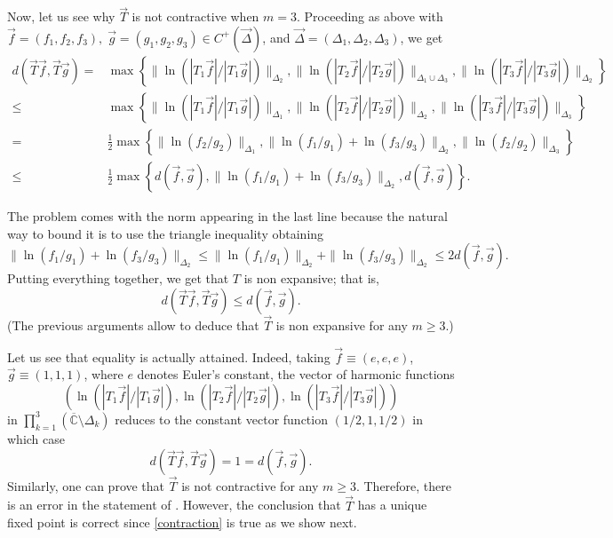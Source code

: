 \documentclass{amsart}
\numberwithin{equation}{section}
\theoremstyle{definition}
\newcommand{\CC}{\mathbb{C}}      %
\begin{document}
  Now, let us see why $\vec{T}$ is not contractive when $m=3$. Proceeding as above with $\vec{f} = (f_1,f_2,f_3),\; \vec{g} = (g_1,g_2,g_3) \in  {C}^+({\vec{\Delta}})$, and $\vec{\Delta} = (\Delta_1,\Delta_2,\Delta_3)$, we get
  \begin{align*}
  	d(\vec{T}\vec{f},\vec{T}\vec{g}) =& \max\left\{  \|\ln (|T_1\vec{f}|/|T_1\vec{g}|)\|_{\Delta_2},   \|\ln (|T_2\vec{f}|/|T_2\vec{g}|)\|_{\Delta_1\cup \Delta_3},  \|\ln (|T_3\vec{f}|/|T_3\vec{g}|)\|_{\Delta_2} \right\}\\
  	                              \leq& \max\left\{  \|\ln (|T_1\vec{f}|/|T_1\vec{g}|)\|_{\Delta_1},   \|\ln (|T_2\vec{f}|/|T_2\vec{g}|)\|_{\Delta_2},  \|\ln (|T_3\vec{f}|/|T_3\vec{g}|)\|_{\Delta_3} \right\}\\
  	                                 =& \frac{1}{2}\max\left\{  \|\ln (f_2/g_2)\|_{\Delta_1},   \|\ln (f_1 /g_1 ) + \ln ( f_3/ g_3)\|_{\Delta_2},  \|\ln (f_2/g_2)\|_{\Delta_3} \right\} \\
  	                              \leq& \frac{1}{2}\max\left\{ d(\vec{f},\vec{g}),   \|\ln (f_1 /g_1 ) + \ln ( f_3/ g_3)\|_{\Delta_2},  d(\vec{f},\vec{g}) \right\}.
  \end{align*}

  The problem comes with the norm appearing in the last line because the natural way to bound it is to use the triangle inequality obtaining
  \[
    \|\ln (f_1 /g_1 ) + \ln ( f_3/ g_3)\|_{\Delta_2} \leq \|\ln (f_1 /g_1 )\|_{\Delta_2} + \|\ln ( f_3/ g_3)\|_{\Delta_2} \leq 2 d(\vec{f},\vec{g}).
  \]
  Putting everything together, we get that $T$ is non expansive; that is,
  \begin{equation} \label{non-expansive} d(\vec{T}\vec{f},\vec{T}\vec{g}) \leq d( \vec{f}, \vec{g}).
  \end{equation}
  (The previous arguments allow to deduce that $\vec{T}$ is non expansive for any $m\geq 3$.)

  Let us see that equality is actually attained.  Indeed, taking $\vec{f} \equiv (e,e,e)$, $\vec{g} \equiv (1,1,1)$, where $e$ denotes Euler's constant, the vector of harmonic functions
  \[
    \left(\ln (|T_1\vec{f}|/|T_1\vec{g}|), \ln (|T_2\vec{f}|/|T_2\vec{g}|) , \ln (|T_3\vec{f}|/|T_3\vec{g}|)\right)
  \]
  in $\prod_{k=1}^3(\overline{\CC} \setminus \Delta_k)$
 reduces to the constant vector function $(1/2,1,1/2)$  in which case
 \[ d(\vec{T}\vec{f},\vec{T}\vec{g}) = 1 = d( \vec{f}, \vec{g}).
 \]
 Similarly, one can prove that $\vec{T}$ is not contractive for any $m \geq 3$. Therefore, there is an error  in the statement of \cite[Proposition 1.1]{sasha99}. However, the conclusion that $\vec{T}$ has a unique fixed point is correct since \eqref{contraction} is true as we show next.
\end{document}
